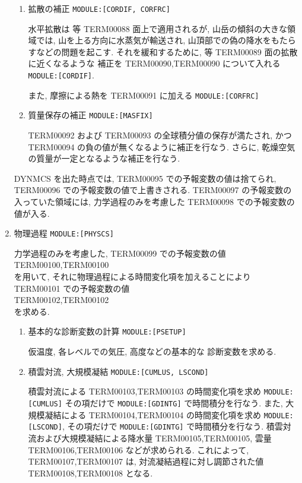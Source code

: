 \begin{enumerate}
\begin{enumerate}
\item 拡散の補正 \texttt{MODULE:[CORDIF, CORFRC]}

水平拡散は 等 TERM00088 面上で適用されるが,
山岳の傾斜の大きな領域では, 山を上る方向に水蒸気が輸送され,
山頂部での偽の降水をもたらすなどの問題を起こす.
それを緩和するために, 等 TERM00089 面の拡散に近くなるような
補正を TERM00090,TERM00090 について入れる \texttt{MODULE:[CORDIF]}. 

また, 摩擦による熱を TERM00091 に加える \texttt{MODULE:[CORFRC]}

\item 質量保存の補正 \texttt{MODULE:[MASFIX]}

TERM00092 および TERM00093 の全球積分値の保存が満たされ,
かつ TERM00094 の負の値が無くなるように補正を行なう.
さらに, 乾燥空気の質量が一定となるような補正を行なう.

\end{enumerate}

DYNMCS を出た時点では,
TERM00095 での予報変数の値は捨てられ,
TERM00096 での予報変数の値で上書きされる.
TERM00097 の予報変数の入っていた領域には,
力学過程のみを考慮した 
TERM00098 での予報変数の値が入る.

\item 物理過程 \texttt{MODULE:[PHYSCS]}

力学過程のみを考慮した, TERM00099 での予報変数の値 \\
TERM00100,TERM00100  \\
を用いて, それに物理過程による時間変化項を加えることにより
TERM00101 での予報変数の値 \\
TERM00102,TERM00102  \\
を求める.

\begin{enumerate}
\item 基本的な診断変数の計算 \texttt{MODULE:[PSETUP]}

仮温度, 各レベルでの気圧, 高度などの基本的な
診断変数を求める.

\item 積雲対流, 大規模凝結 \texttt{MODULE:[CUMLUS, LSCOND]}

積雲対流による TERM00103,TERM00103 の時間変化項を求め \texttt{MODULE:[CUMLUS]}
その項だけで \texttt{MODULE:[GDINTG]} で時間積分を行なう.
また, 大規模凝結による TERM00104,TERM00104 の時間変化項を求め \texttt{MODULE:[LSCOND]},
その項だけで \texttt{MODULE:[GDINTG]} で時間積分を行なう.
積雲対流および大規模凝結による降水量 TERM00105,TERM00105, 
雲量 TERM00106,TERM00106 などが求められる.
これによって, TERM00107,TERM00107 は,
対流凝結過程に対し調節された値
TERM00108,TERM00108 
となる.


\end{enumerate}
\end{enumerate}

